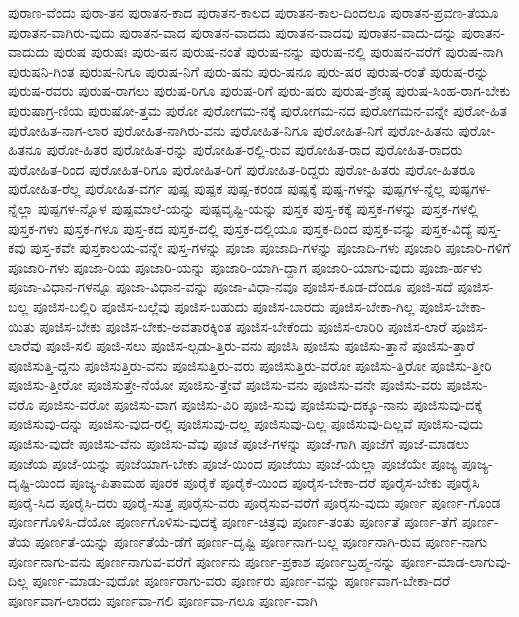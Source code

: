 {ಪುರಾಣ-ವೆಂದು
ಪುರಾ-ತನ
ಪುರಾತನ-ಕಾದ
ಪುರಾತನ-ಕಾಲದ
ಪುರಾತನ-ಕಾಲ-ದಿಂದಲೂ
ಪುರಾತನ-ಪ್ರವಣ-ತೆಯೂ
ಪುರಾತನ-ವಾಗಿರು-ವುದು
ಪುರಾತನ-ವಾದ
ಪುರಾತನ-ವಾದದು
ಪುರಾತನ-ವಾದವು
ಪುರಾತನ-ವಾದು-ದನ್ನು
ಪುರಾತನ-ವಾದುದು
ಪುರುಷ
ಪುರುಷಃ
ಪುರು-ಷನ
ಪುರುಷ-ನಂತೆ
ಪುರುಷ-ನನ್ನು
ಪುರುಷ-ನಲ್ಲಿ
ಪುರುಷನ-ವರೆಗೆ
ಪುರುಷ-ನಾಗಿ
ಪುರುಷನಿ-ಗಿಂತ
ಪುರುಷ-ನಿಗೂ
ಪುರುಷ-ನಿಗೆ
ಪುರು-ಷನು
ಪುರು-ಷನೂ
ಪುರು-ಷರ
ಪುರುಷ-ರಂತೆ
ಪುರುಷ-ರನ್ನು
ಪುರುಷ-ರವರು
ಪುರುಷ-ರಾಗಲು
ಪುರುಷ-ರಿಗೂ
ಪುರುಷ-ರಿಗೆ
ಪುರು-ಷರು
ಪುರುಷ-ಶ್ರೇಷ್ಠ
ಪುರುಷ-ಸಿಂಹ-ರಾಗ-ಬೇಕು
ಪುರುಷಾಗ್ರ-ಣಿಯ
ಪುರುಷೋ-ತ್ತಮ
ಪುರೋ
ಪುರೋಗಮ-ನಕ್ಕೆ
ಪುರೋಗಮ-ನದ
ಪುರೋಗಮನ-ವನ್ನೇ
ಪುರೋ-ಹಿತ
ಪುರೋಹಿತ-ನಾಗ-ಲಾರ
ಪುರೋಹಿತ-ನಾಗಿರು-ವನು
ಪುರೋಹಿತ-ನಿಗೂ
ಪುರೋಹಿತ-ನಿಗೆ
ಪುರೋ-ಹಿತನು
ಪುರೋ-ಹಿತನೂ
ಪುರೋ-ಹಿತರ
ಪುರೋಹಿತ-ರನ್ನು
ಪುರೋಹಿತ-ರಲ್ಲಿ-ರುವ
ಪುರೋಹಿತ-ರಾದ
ಪುರೋಹಿತ-ರಾದರು
ಪುರೋಹಿತ-ರಿಂದ
ಪುರೋಹಿತ-ರಿಗೂ
ಪುರೋಹಿತ-ರಿಗೆ
ಪುರೋಹಿತ-ರಿದ್ದರು
ಪುರೋ-ಹಿತರು
ಪುರೋ-ಹಿತರೂ
ಪುರೋಹಿತ-ರೆಲ್ಲ
ಪುರೋಹಿತ-ವರ್ಗ
ಪುಷ್ಪ
ಪುಷ್ಪಕ
ಪುಷ್ಪ-ಕರಂಡ
ಪುಷ್ಪಕ್ಕೆ
ಪುಷ್ಪ-ಗಳನ್ನು
ಪುಷ್ಪಗಳ-ನ್ನೆಲ್ಲ
ಪುಷ್ಪಗಳ-ನ್ನೆಲ್ಲಾ
ಪುಷ್ಪಗಳ-ನ್ನೊಳ
ಪುಷ್ಪಮಾಲೆ-ಯನ್ನು
ಪುಷ್ಪವೃಷ್ಟಿ-ಯನ್ನು
ಪುಸ್ತಕ
ಪುಸ್ತ-ಕಕ್ಕೆ
ಪುಸ್ತಕ-ಗಳನ್ನು
ಪುಸ್ತಕ-ಗಳಲ್ಲಿ
ಪುಸ್ತಕ-ಗಳು
ಪುಸ್ತಕ-ಗಳೂ
ಪುಸ್ತ-ಕದ
ಪುಸ್ತಕ-ದಲ್ಲಿ
ಪುಸ್ತಕ-ದಲ್ಲಿಯೂ
ಪುಸ್ತಕ-ದಿಂದ
ಪುಸ್ತಕ-ವನ್ನು
ಪುಸ್ತಕ-ವಿದ್ಯೆ
ಪುಸ್ತ-ಕವು
ಪುಸ್ತ-ಕವೇ
ಪುಸ್ತಕಾಲಯ-ವನ್ನೇ
ಪುಸ್ತ-ಗಳನ್ನು
ಪೂಜಾ
ಪೂಜಾದಿ-ಗಳನ್ನು
ಪೂಜಾದಿ-ಗಳು
ಪೂಜಾರಿ
ಪೂಜಾರಿ-ಗಳಿಗೆ
ಪೂಜಾರಿ-ಗಳು
ಪೂಜಾ-ರಿಯ
ಪೂಜಾರಿ-ಯನ್ನು
ಪೂಜಾರಿ-ಯಾಗಿ-ದ್ದಾಗ
ಪೂಜಾರಿ-ಯಾಗು-ವುದು
ಪೂಜಾ-ರ್ಹಳು
ಪೂಜಾ-ವಿಧಾನ-ಗಳನ್ನೂ
ಪೂಜಾ-ವಿಧಾನ-ವನ್ನು
ಪೂಜಾ-ವಿಧಾ-ನವೂ
ಪೂಜಿಸ-ಕೂಡ-ದೆಂದೂ
ಪೂಜಿ-ಸದೆ
ಪೂಜಿಸ-ಬಲ್ಲ
ಪೂಜಿಸ-ಬಲ್ಲಿರಿ
ಪೂಜಿಸ-ಬಲ್ಲೆವು
ಪೂಜಿಸ-ಬಹುದು
ಪೂಜಿಸ-ಬಾರದು
ಪೂಜಿಸ-ಬೇಕಾ-ಗಿಲ್ಲ
ಪೂಜಿಸ-ಬೇಕಾ-ಯಿತು
ಪೂಜಿಸ-ಬೇಕು
ಪೂಜಿಸ-ಬೇಕು-ಅವತಾರಕ್ಕಿಂತ
ಪೂಜಿಸ-ಬೇಕೆಂದು
ಪೂಜಿಸ-ಲಾರಿರಿ
ಪೂಜಿಸ-ಲಾರೆ
ಪೂಜಿಸ-ಲಾರೆವು
ಪೂಜಿ-ಸಲಿ
ಪೂಜಿ-ಸಲು
ಪೂಜಿಸ-ಲ್ಪಡು-ತ್ತಿರು-ವನು
ಪೂಜಿಸಿ
ಪೂಜಿಸು
ಪೂಜಿಸು-ತ್ತಾನೆ
ಪೂಜಿಸು-ತ್ತಾರೆ
ಪೂಜಿಸುತ್ತಿ-ದ್ದನು
ಪೂಜಿಸುತ್ತಿರು-ವನು
ಪೂಜಿಸುತ್ತಿರು-ವರು
ಪೂಜಿಸುತ್ತಿರು-ವರೋ
ಪೂಜಿಸು-ತ್ತಿರೋ
ಪೂಜಿಸು-ತ್ತೀರಿ
ಪೂಜಿಸು-ತ್ತೀರೋ
ಪೂಜಿಸುತ್ತೇ-ನೆಯೋ
ಪೂಜಿಸು-ತ್ತೇವೆ
ಪೂಜಿಸು-ವನು
ಪೂಜಿಸು-ವನೇ
ಪೂಜಿಸು-ವರು
ಪೂಜಿಸು-ವರೊ
ಪೂಜಿಸು-ವರೋ
ಪೂಜಿಸು-ವಾಗ
ಪೂಜಿಸು-ವಿರಿ
ಪೂಜಿ-ಸುವು
ಪೂಜಿಸುವು-ದಕ್ಕೂ-ನಾನು
ಪೂಜಿಸುವು-ದಕ್ಕೆ
ಪೂಜಿಸುವು-ದನ್ನು
ಪೂಜಿಸು-ವುದ-ರಲ್ಲಿ
ಪೂಜಿಸುವು-ದಲ್ಲ
ಪೂಜಿಸುವು-ದಿಲ್ಲ
ಪೂಜಿಸುವು-ದಿಲ್ಲವೆ
ಪೂಜಿಸು-ವುದು
ಪೂಜಿಸು-ವುದೇ
ಪೂಜಿಸು-ವೆನು
ಪೂಜಿಸು-ವೆವು
ಪೂಜೆ
ಪೂಜೆ-ಗಳನ್ನು
ಪೂಜೆ-ಗಾಗಿ
ಪೂಜೆಗೆ
ಪೂಜೆ-ಮಾಡಲು
ಪೂಜೆಯ
ಪೂಜೆ-ಯನ್ನು
ಪೂಜೆಯಾಗ-ಬೇಕು
ಪೂಜೆ-ಯಿಂದ
ಪೂಜೆಯು
ಪೂಜೆ-ಯೆಲ್ಲಾ
ಪೂಜೆಯೇ
ಪೂಜ್ಯ
ಪೂಜ್ಯ-ದೃಷ್ಟಿ-ಯಿಂದ
ಪೂಜ್ಯ-ಪಿತಾಮಹ
ಪೂರಕ
ಪೂರೈಕೆ
ಪೂರೈಕೆ-ಯಿಂದ
ಪೂರೈಸ-ಬೇಕಾ-ದರೆ
ಪೂರೈಸ-ಬೇಕು
ಪೂರೈಸಿ
ಪೂರೈ-ಸಿದ
ಪೂರೈಸಿ-ದರು
ಪೂರೈ-ಸುತ್ತ
ಪೂರೈಸು-ವರು
ಪೂರೈಸುವ-ವರೆಗೆ
ಪೂರೈಸು-ವುದು
ಪೂರ್ಣ
ಪೂರ್ಣ-ಗೊಂಡ
ಪೂರ್ಣಗೊಳಿಸಿ-ದೆಯೋ
ಪೂರ್ಣಗೊಳಿಸು-ವುದಕ್ಕೆ
ಪೂರ್ಣ-ಚಿತ್ರವು
ಪೂರ್ಣ-ತಂತು
ಪೂರ್ಣತೆ
ಪೂರ್ಣ-ತೆಗೆ
ಪೂರ್ಣ-ತೆಯ
ಪೂರ್ಣತೆ-ಯನ್ನು
ಪೂರ್ಣತೆಯೆ-ಡೆಗೆ
ಪೂರ್ಣ-ದೃಷ್ಟಿ
ಪೂರ್ಣನಾಗ-ಬಲ್ಲ
ಪೂರ್ಣನಾಗಿ-ರುವ
ಪೂರ್ಣ-ನಾಗು
ಪೂರ್ಣನಾಗು-ವನು
ಪೂರ್ಣನಾಗುವ-ವರೆಗೆ
ಪೂರ್ಣನು
ಪೂರ್ಣ-ಪ್ರಕಾಶ
ಪೂರ್ಣಬ್ರಹ್ಮ-ನನ್ನು
ಪೂರ್ಣ-ಮಾಡ-ಲಾಗುವು-ದಿಲ್ಲ
ಪೂರ್ಣ-ಮಾಡು-ವುದೋ
ಪೂರ್ಣರಾಗು-ವರು
ಪೂರ್ಣರು
ಪೂರ್ಣ-ವನ್ನು
ಪೂರ್ಣವಾಗ-ಬೇಕಾ-ದರೆ
ಪೂರ್ಣವಾಗ-ಲಾರದು
ಪೂರ್ಣವಾ-ಗಲಿ
ಪೂರ್ಣವಾ-ಗಲೂ
ಪೂರ್ಣ-ವಾಗಿ
}
